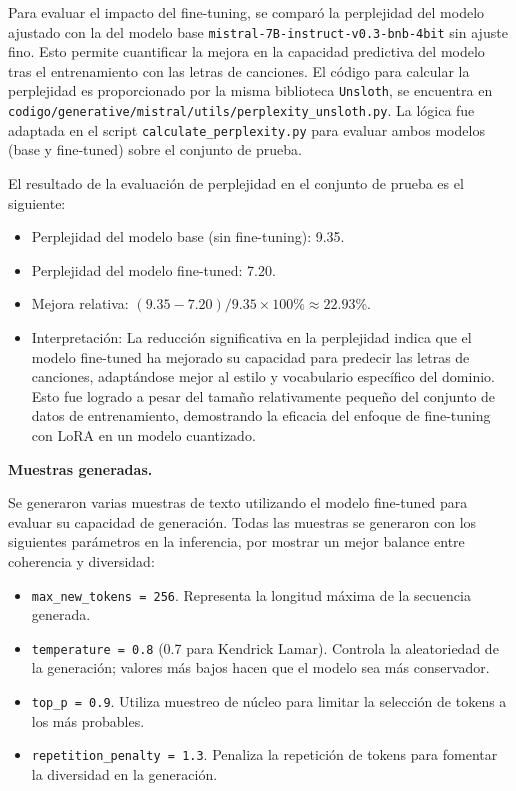 \documentclass[paper=letter, fontsize=11pt, draft=false]{scrartcl}
\numberwithin{equation}{section} %
\numberwithin{figure}{section} %
\numberwithin{table}{section} %
\numberwithin{subsection}{section}
\begin{document}
Para evaluar el impacto del fine-tuning, se comparó la perplejidad del modelo ajustado con la del modelo base \texttt{mistral-7B-instruct-v0.3-bnb-4bit} sin ajuste fino. Esto permite cuantificar la mejora en la capacidad predictiva del modelo tras el entrenamiento con las letras de canciones. El código para calcular la perplejidad es proporcionado por la misma biblioteca \texttt{Unsloth}, se encuentra en \texttt{codigo/generative/mistral/utils/perplexity\_unsloth.py}. La lógica fue adaptada en el script \texttt{calculate\_perplexity.py} para evaluar ambos modelos (base y fine-tuned) sobre el conjunto de prueba.

El resultado de la evaluación de perplejidad en el conjunto de prueba es el siguiente:
\begin{itemize}
    \item Perplejidad del modelo base (sin fine-tuning): 9.35.
    \item Perplejidad del modelo fine-tuned: 7.20.
    \item Mejora relativa: \((9.35 - 7.20) / 9.35 \times 100\% \approx 22.93\%\).
    \item Interpretación: La reducción significativa en la perplejidad indica que el modelo fine-tuned ha mejorado su capacidad para predecir las letras de canciones, adaptándose mejor al estilo y vocabulario específico del dominio. Esto fue logrado a pesar del tamaño relativamente pequeño del conjunto de datos de entrenamiento, demostrando la eficacia del enfoque de fine-tuning con LoRA en un modelo cuantizado.
\end{itemize}

\textbf{Muestras generadas.} 

Se generaron varias muestras de texto utilizando el modelo fine-tuned para evaluar su capacidad de generación. Todas las muestras se generaron con los siguientes parámetros en la inferencia, por mostrar un mejor balance entre coherencia y diversidad:
\begin{itemize}
    \item \texttt{max\_new\_tokens = 256}. Representa la longitud máxima de la secuencia generada.
    \item \texttt{temperature = 0.8} (0.7 para Kendrick Lamar). Controla la aleatoriedad de la generación; valores más bajos hacen que el modelo sea más conservador.
    \item \texttt{top\_p = 0.9}. Utiliza muestreo de núcleo para limitar la selección de tokens a los más probables.
    \item \texttt{repetition\_penalty = 1.3}. Penaliza la repetición de tokens para fomentar la diversidad en la generación.
\end{itemize}
\end{document}
